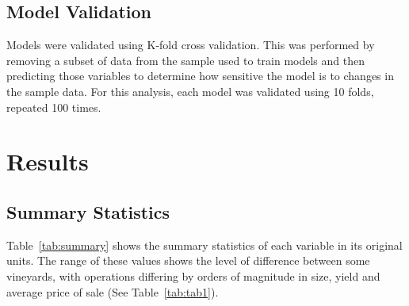 \documentclass[10pt,letterpaper]{article}
\begin{document}
\subsection*{Model Validation}
Models were validated using K-fold cross validation. This was performed by removing a subset of data from the sample used to train models and then predicting those variables to determine how sensitive the model is to changes in the sample data. For this analysis, each model was validated using 10 folds, repeated 100 times.
\par
\section*{Results}
\subsection*{Summary Statistics}\label{sec:exp_anal}
 Table~\ref{tab:summary} shows the summary statistics of each variable in its original units. The range of these values shows the level of difference between some vineyards, with operations differing by orders of magnitude in size, yield and average price of sale (See Table~\ref{tab:tab1}).
\par
\end{document}
